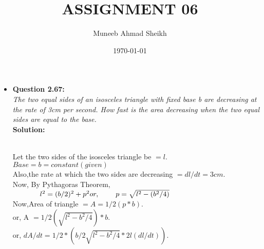 \documentclass[tikz,border=2pt,png]{article}
\begin{document}
\title{ASSIGNMENT 06}
\author{Muneeb Ahmad Sheikh}
\date{\today}
\maketitle
\begin{itemize}

\item{\textbf{Question 2.67:}}\\

\textit{The two equal sides of an isosceles triangle with fixed base b are decreasing at the rate of 3cm per second. How fast is the area decreasing when the two equal sides are equal to the base.}\\

\textbf{Solution:}\\

\begin{centre}
\end{centre}\\


Let the two sides of the isosceles triangle be $=l$.\\

$ Base=b=constant(given)$\\ 

Also,the rate at which the two sides are decreasing $=dl/dt=3cm$.\\

Now, By Pythagoras Theorem,\\
$

\hspace{1.3 cm}l^2=(b/2)^2+p^2\\

or, \hspace{0.8 cm}p= \sqrt{l^2-(b^2/4)}$\\

Now,\hspace{0.6 cm}Area of triangle $=A=1/2(p*b)$.\\

or, \hspace{0.8 cm}A $=1/2(\sqrt{l^2-b^2/4})*b$.\\

or, \hspace{0.8 cm}$dA/dt=1/2*(b/2\sqrt{l^2-b^2/4}*2l(dl/dt))$.\\


\end{itemize}
\end{document}
